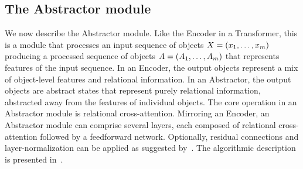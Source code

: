 \subsection{The Abstractor module}\label{ssec:abstractor_module}

We now describe the Abstractor module. Like the Encoder in a Transformer, this is a module that processes an input sequence of objects $X = \left(x_1, \ldots, x_m\right)$ producing a processed sequence of objects $A = \left(A_1, \ldots, A_m\right)$ that represents features of the input sequence. In an Encoder, the output objects represent a mix of object-level features and relational information. In an Abstractor, the output objects are abstract states that represent purely relational information, abstracted away from the features of individual objects. The core operation in an Abstractor module is relational cross-attention. Mirroring an Encoder, an Abstractor module can comprise several layers, each composed of relational cross-attention followed by a feedforward network. Optionally, residual connections and layer-normalization can be applied as suggested by~\citet{vaswani2017attention}. The algorithmic description is presented in~.

